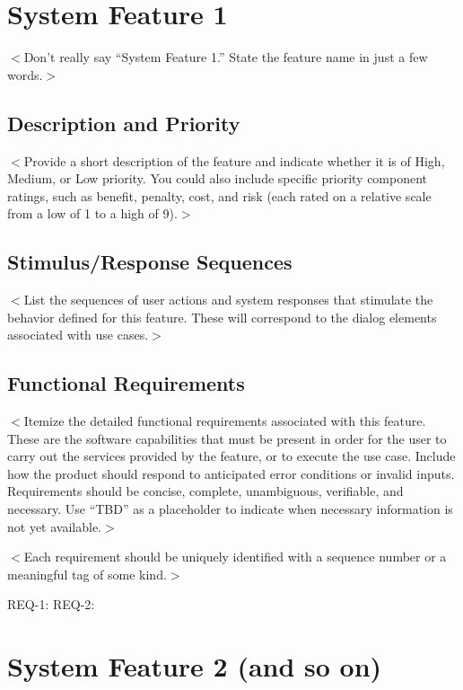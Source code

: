 \documentclass{scrreprt}
\begin{document}
\section{System Feature 1}
$<$Don’t really say “System Feature 1.” State the feature name in just a few 
words.$>$

\subsection{Description and Priority}
\begin{CJK}{UTF8}{<font>}
$<$Provide a short description of the feature and indicate whether it is of 
High, Medium, or Low priority. You could also include specific priority 
component ratings, such as benefit, penalty, cost, and risk (each rated on a 
relative scale from a low of 1 to a high of 9).$>$
\end{CJK}

\subsection{Stimulus/Response Sequences}
\begin{CJK}{UTF8}{<font>}
$<$List the sequences of user actions and system responses that stimulate the 
behavior defined for this feature. These will correspond to the dialog elements 
associated with use cases.$>$
\end{CJK}

\subsection{Functional Requirements}
\begin{CJK}{UTF8}{<font>}
$<$Itemize the detailed functional requirements associated with this feature.  
These are the software capabilities that must be present in order for the user 
to carry out the services provided by the feature, or to execute the use case.  
Include how the product should respond to anticipated error conditions or 
invalid inputs. Requirements should be concise, complete, unambiguous, 
verifiable, and necessary. Use “TBD” as a placeholder to indicate when necessary 
information is not yet available.$>$
\end{CJK}

$<$Each requirement should be uniquely identified with a sequence number or a 
meaningful tag of some kind.$>$

REQ-1:	REQ-2:

\section{System Feature 2 (and so on)}
\end{document}
